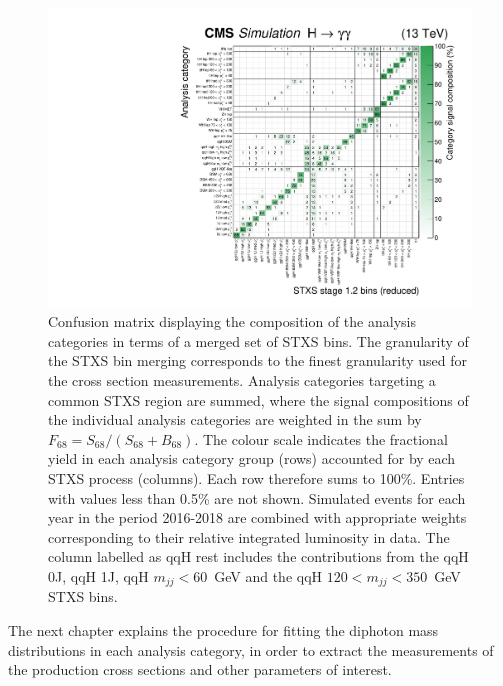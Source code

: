 \begin{figure}[htb!]
  \centering
  \includegraphics[width=.95\textwidth]{Figures/hgg_overview/purityMatrix_merged.pdf}
  \caption[Confusion matrix for the analysis categories]
  {
    Confusion matrix displaying the composition of the analysis categories in terms of a merged set of STXS bins. The granularity of the STXS bin merging corresponds to the finest granularity used for the cross section measurements. Analysis categories targeting a common STXS region are summed, where the signal compositions of the individual analysis categories are weighted in the sum by $F_{68}=S_{68}/(S_{68}+B_{68})$. The colour scale indicates the fractional yield in each analysis category group (rows) accounted for by each STXS process (columns). Each row therefore sums to 100\%. Entries with values less than 0.5\% are not shown. Simulated events for each year in the period 2016-2018 are combined with appropriate weights corresponding to their relative integrated luminosity in data. The column labelled as qqH rest includes the contributions from the qqH 0J, qqH 1J, qqH $m_{jj}<60$~GeV and the qqH $120<m_{jj}<350$~GeV STXS bins.
  }
  \label{fig:purity_matrix}
\end{figure}

The next chapter explains the procedure for fitting the diphoton mass distributions in each analysis category, in order to extract the measurements of the production cross sections and other parameters of interest.







